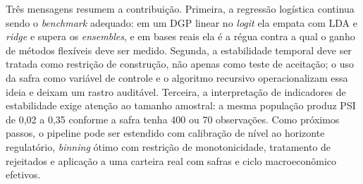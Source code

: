 \documentclass[11pt,a4paper]{article}
\begin{document}
Três mensagens resumem a contribuição. Primeira, a regressão logística continua sendo o \emph{benchmark} adequado: em um DGP linear no \emph{logit} ela empata com LDA e \emph{ridge} e supera os \emph{ensembles}, e em bases reais ela é a régua contra a qual o ganho de métodos flexíveis deve ser medido. Segunda, a estabilidade temporal deve ser tratada como restrição de construção, não apenas como teste de aceitação; o uso da safra como variável de controle e o algoritmo recursivo operacionalizam essa ideia e deixam um rastro auditável. Terceira, a interpretação de indicadores de estabilidade exige atenção ao tamanho amostral: a mesma população produz PSI de 0{,}02 a 0{,}35 conforme a safra tenha 400 ou 70 observações. Como próximos passos, o pipeline pode ser estendido com calibração de nível ao horizonte regulatório, \emph{binning} ótimo com restrição de monotonicidade, tratamento de rejeitados e aplicação a uma carteira real com safras e ciclo macroeconômico efetivos.



\end{document}
